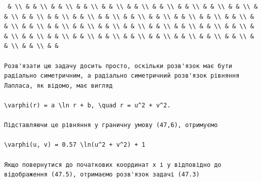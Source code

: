 \documentclass[
  ukrainian,
]{article}
\begin{document}
\begin{verbatim}
 & \\ & & \\ & & \\ & & \\ & & \\ & & \\ & & \\ & & \\ & & \\ & & \\ & & \\ & & \\ & & \\ & & \\ & & \\ & & \\ & & \\ & & \\ & & \\ & & \\ & & \\ & & \\ & & \\ & & \\ & & \\ & & \\ & & \\ & & \\ & & \\ & & \\ & & \\ & & \\ & & \\ & & \\ & & \\ & & \\ & & \\ & & \\ & & \\ & & \\ & & \\ & & \\ & &

Розв'язати цю задачу досить просто, оскільки розв'язок має бути радіально симетричним, а радіально симетричний розв'язок рівняння Лапласа, як відомо, має вигляд

\varphi(r) = a \ln r + b, \quad r = u^2 + v^2.

Підставляючи це рівняння у граничну умову (47,6), отримуємо

\varphi(u, v) = 0.57 \ln(u^2 + v^2) + 1

Якщо повернутися до початкових координат x і y відповідно до відображення (47.5), отримаємо розв'язок задачі (47.3)


\end{verbatim}
\end{document}
